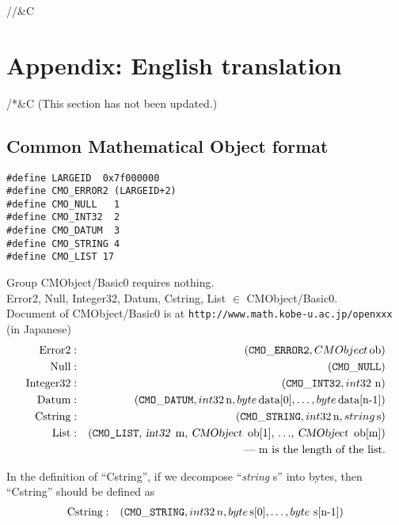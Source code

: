 //&C \section{Appendix: English translation}

/*&C
\noindent
(This section has not been updated.)

\subsection{Common Mathematical Object format}

\begin{verbatim}
#define LARGEID  0x7f000000
#define CMO_ERROR2 (LARGEID+2)
#define CMO_NULL   1
#define CMO_INT32  2
#define CMO_DATUM  3
#define CMO_STRING 4
#define CMO_LIST 17
\end{verbatim}

\bigbreak
\noindent
Group CMObject/Basic0  requires nothing. \\
Error2, Null, Integer32, Datum, Cstring, List $\in$ CMObject/Basic0. \\
Document of CMObject/Basic0 is at {\tt http://www.math.kobe-u.ac.jp/openxxx}
(in Japanese) \\
\begin{eqnarray*}
\mbox{Error2}&:& ({\tt CMO\_ERROR2}, {\sl CMObject}\, \mbox{ob}) \\
\mbox{Null}  &:& ({\tt CMO\_NULL}) \\
\mbox{Integer32}
             &:& ({\tt CMO\_INT32}, {\sl int32}\ \mbox{n}) \\
\mbox{Datum} &:& ({\tt CMO\_DATUM}, {\sl int32}\, \mbox{n}, {\sl byte}\, 
                 \mbox{data[0]}, 
                  \ldots , {\sl byte}\, \mbox{data[n-1]}) \\
\mbox{Cstring}&:& ({\tt CMO\_STRING},{\sl int32}\,  \mbox{n}, 
                   {\sl string}\, \mbox{s}) \\
\mbox{List} &:& 
\mbox{({\tt CMO\_LIST}, {\sl int32}\, m, {\sl CMObject}\, ob[1], $\ldots$,
                                       {\sl CMObject}\, ob[m])} \\
             & & \mbox{---  m is the length of the list.} \\
\end{eqnarray*}

In the definition of ``Cstring'', if we decompose  ``{\sl string} s'' into 
bytes, then  ``Cstring'' should be defined as
\begin{eqnarray*}
\mbox{Cstring}&:& ({\tt CMO\_STRING},{\sl int32}\,  n, 
                  {\sl byte}\, \mbox{s[0]},
                  \ldots, {\sl byte}\ \mbox{s[n-1]})
\end{eqnarray*}

